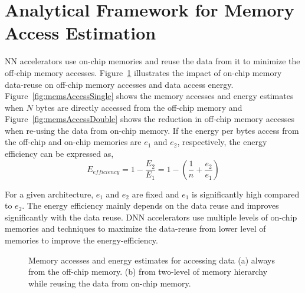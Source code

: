 \documentclass[a4paper,10pt]{article}
\begin{document}
\section{Analytical Framework for Memory Access Estimation}\label{AnalyticalFramework}
NN accelerators use on-chip memories and reuse the data from it to minimize the off-chip memory accesses. Figure~\ref{fig:memsAccess} illustrates the impact of on-chip memory data-reuse on off-chip memory accesses and data access energy. Figure~\ref{fig:memsAccessSingle} shows the memory accesses and energy estimates when $N$ bytes are directly accessed from the off-chip memory and Figure~\ref{fig:memsAccessDouble} shows the reduction in off-chip memory accesses when re-using the data from on-chip memory. If the energy per bytes access from the off-chip and on-chip memories are $e_{1}$ and $e_{2}$, respectively, the energy efficiency can be expressed as, 
\begin{equation}\label{e_efficiency}
	E_{efficiency}=1-\frac{E_2}{E_1}=1-(\frac{1}{n}+\frac{e_{2}}{e_{1}})
\end{equation}

For a given architecture, $e_{1}$ and $e_{2}$ are fixed and $e_1$ is significantly high compared to $e_2$. The energy efficiency mainly depends on the data reuse and improves significantly with the data reuse. DNN accelerators use multiple levels of on-chip memories and techniques to maximize the data-reuse from lower level of memories to improve the energy-efficiency. 
\begin{figure}[!htb]
	\centering
    \captionsetup{font=sf}
	\hfil	
	\hfil	
	\caption{Memory accesses and energy estimates for accessing data (a) always from the off-chip memory. (b) from two-level of memory hierarchy while reusing the data from on-chip memory.}
	\label{fig:memsAccess}
\end{figure}
\end{document}
